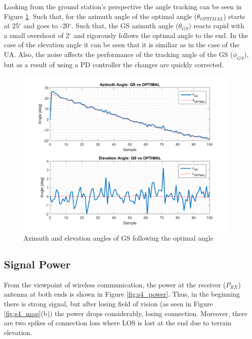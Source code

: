 Looking from the ground station's perspective the angle tracking can be seen in Figure \ref{fig:s4_gs}. Such that, for the azimuth angle of the optimal angle ($\theta_{OPTIMAL}$) starts at 25$^{\circ}$ and goes to -20$^{\circ}$. Such that, the GS azimuth angle ($\theta_{GS}$) reacts rapid with a small overshoot of 2$^{\circ}$ and rigorously follows the optimal angle to the end. In the case of the elevation angle it can be seen that it is similiar as in the case of the UA. Also, the noise affects the performance of the tracking angle of the GS ($\phi_{GS}$), but as a result of using a PD controller the changes are quickly corrected.

\begin{figure}[H]
	\centering
	\includegraphics[scale=0.8]{figures/s4_gs.png}
	\caption{Azimuth and elevation angles of GS following the optimal angle}
	\label{fig:s4_gs}
\end{figure}

\subsection*{Signal Power}
From the viewpoint of wireless communication, the power at the receiver ($P_{RX}$) antenna at both ends is shown in Figure \ref{fig:s4_power}. Thus, in the beginning there is strong signal, but after losing field of vision (as seen in Figure \ref{fig:s4_map}(b)) the power drops considerably, losing connection. Moreover, there are two spikes of connection loss where LOS is lost at the end due to terrain elevation.

